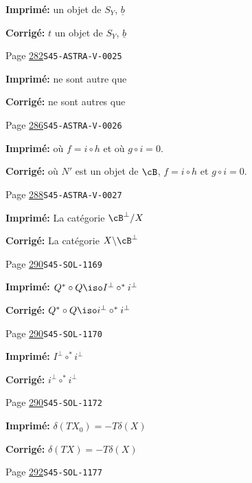 \begin{description}
\par\noindent\textbf{Imprimé:} un objet de $S_Y$, $\underline b$
\par\noindent\textbf{Corrigé:} $t$ un objet de $S_Y$, $\underline b$
\smallskip
\item[\hypertarget{apparatus:FR-0288}{288}] Page \hyperlink{printpage:fr:282}{282}\quad\texttt{S45-ASTRA-V-0025}
\par\noindent\textbf{Imprimé:} ne sont autre que
\par\noindent\textbf{Corrigé:} ne sont autres que
\smallskip
\item[\hypertarget{apparatus:FR-0289}{289}] Page \hyperlink{printpage:fr:286}{286}\quad\texttt{S45-ASTRA-V-0026}
\par\noindent\textbf{Imprimé:} où $f=i\circ h$ et où $g\circ i=0$.
\par\noindent\textbf{Corrigé:} où $N'$ est un objet de $\cB$, $f=i\circ h$ et $g\circ i=0$.
\smallskip
\item[\hypertarget{apparatus:FR-0290}{290}] Page \hyperlink{printpage:fr:288}{288}\quad\texttt{S45-ASTRA-V-0027}
\par\noindent\textbf{Imprimé:} La catégorie $\cB^\bot/X$
\par\noindent\textbf{Corrigé:} La catégorie $X\backslash\cB^\bot$
\smallskip
\item[\hypertarget{apparatus:FR-0291}{291}] Page \hyperlink{printpage:fr:290}{290}\quad\texttt{S45-SOL-1169}
\par\noindent\textbf{Imprimé:} \(Q^\ast\circ Q\iso I^\bot\circ ^\ast i^\bot\)
\par\noindent\textbf{Corrigé:} \(Q^\ast\circ Q\iso i^\bot\circ ^\ast i^\bot\)
\smallskip
\item[\hypertarget{apparatus:FR-0292}{292}] Page \hyperlink{printpage:fr:290}{290}\quad\texttt{S45-SOL-1170}
\par\noindent\textbf{Imprimé:} \(I^\bot\circ ^\ast i^\bot\)
\par\noindent\textbf{Corrigé:} \(i^\bot\circ ^\ast i^\bot\)
\smallskip
\item[\hypertarget{apparatus:FR-0293}{293}] Page \hyperlink{printpage:fr:290}{290}\quad\texttt{S45-SOL-1172}
\par\noindent\textbf{Imprimé:} \(\delta(T X_0) = - T \delta(X)\)
\par\noindent\textbf{Corrigé:} \(\delta(T X) = - T \delta(X)\)
\smallskip
\item[\hypertarget{apparatus:FR-0294}{294}] Page \hyperlink{printpage:fr:292}{292}\quad\texttt{S45-SOL-1177}

\end{description}
